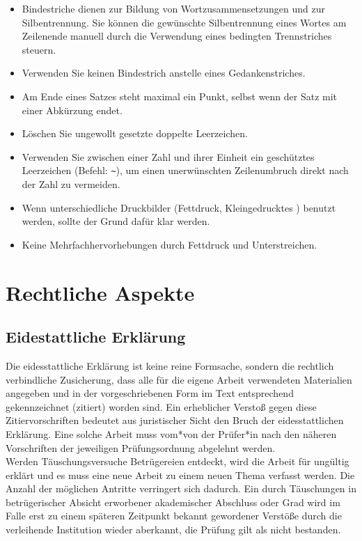 \begin{itemize}
	\item	Bindestriche dienen zur Bildung von Wortzusammensetzungen und zur Silbentrennung. Sie können die gewünschte Silbentrennung eines Wortes am Zeilenende manuell durch die Verwendung eines bedingten Trennstriches steuern.
	\item	Verwenden Sie keinen Bindestrich anstelle eines Gedankenstriches.
	\item	Am Ende eines Satzes steht maximal ein Punkt, selbst wenn der Satz mit einer Abkürzung endet.
	\item	Löschen Sie ungewollt gesetzte doppelte Leerzeichen.
	\item	Verwenden Sie zwischen einer Zahl und ihrer Einheit ein geschütztes Leerzeichen (Befehl: \verb|~|), um einen unerwünschten Zeilenumbruch direkt nach der Zahl zu vermeiden.
	\item	Wenn unterschiedliche Druckbilder (Fettdruck, Kleingedrucktes \etc) benutzt werden, sollte der Grund dafür klar werden.
	\item	Keine Mehrfachhervorhebungen durch Fettdruck und Unterstreichen.
\end{itemize}

\section{Rechtliche Aspekte}
\subsection{Eidestattliche Erklärung}
Die eidesstattliche Erklärung ist keine reine Formsache, sondern die rechtlich verbindliche Zusicherung, dass alle für die eigene Arbeit verwendeten Materialien angegeben und in der vorgeschriebenen Form im Text entsprechend gekennzeichnet (zitiert) worden sind. Ein erheblicher Verstoß gegen diese Zitiervorschriften bedeutet aus juristischer Sicht den Bruch der eidesstattlichen Erklärung. Eine solche Arbeit muss vom*von der Prüfer*in nach den näheren Vorschriften der jeweiligen Prüfungsordnung abgelehnt werden.\vspace{3mm} \\
Werden Täuschungsversuche \bzw Betrügereien entdeckt, wird die Arbeit für ungültig erklärt und es muss eine neue Arbeit zu einem neuen Thema verfasst werden. Die Anzahl der möglichen Antritte verringert sich dadurch. \vspace{3mm}\newline
Ein durch Täuschungen \bzw in betrügerischer Absicht erworbener akademischer Abschluss oder Grad wird im Falle erst zu einem späteren Zeitpunkt bekannt gewordener Verstöße durch die verleihende Institution wieder aberkannt, die Prüfung gilt als nicht bestanden.


